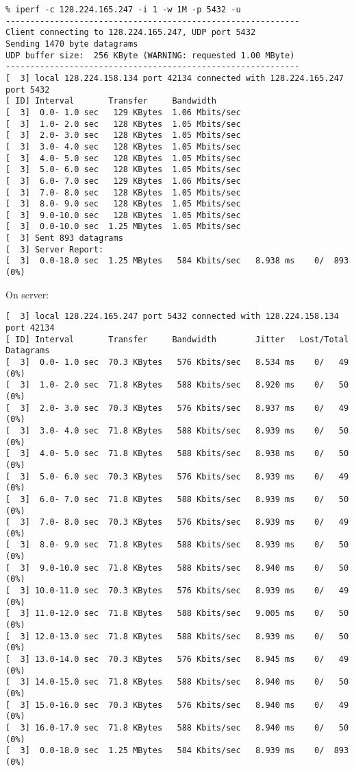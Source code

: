 \documentclass[a4paper]{report}
\begin{document}
\begin{lstlisting}
% iperf -c 128.224.165.247 -i 1 -w 1M -p 5432 -u
------------------------------------------------------------
Client connecting to 128.224.165.247, UDP port 5432
Sending 1470 byte datagrams
UDP buffer size:  256 KByte (WARNING: requested 1.00 MByte)
------------------------------------------------------------
[  3] local 128.224.158.134 port 42134 connected with 128.224.165.247 port 5432
[ ID] Interval       Transfer     Bandwidth
[  3]  0.0- 1.0 sec   129 KBytes  1.06 Mbits/sec
[  3]  1.0- 2.0 sec   128 KBytes  1.05 Mbits/sec
[  3]  2.0- 3.0 sec   128 KBytes  1.05 Mbits/sec
[  3]  3.0- 4.0 sec   128 KBytes  1.05 Mbits/sec
[  3]  4.0- 5.0 sec   128 KBytes  1.05 Mbits/sec
[  3]  5.0- 6.0 sec   128 KBytes  1.05 Mbits/sec
[  3]  6.0- 7.0 sec   129 KBytes  1.06 Mbits/sec
[  3]  7.0- 8.0 sec   128 KBytes  1.05 Mbits/sec
[  3]  8.0- 9.0 sec   128 KBytes  1.05 Mbits/sec
[  3]  9.0-10.0 sec   128 KBytes  1.05 Mbits/sec
[  3]  0.0-10.0 sec  1.25 MBytes  1.05 Mbits/sec
[  3] Sent 893 datagrams
[  3] Server Report:
[  3]  0.0-18.0 sec  1.25 MBytes   584 Kbits/sec   8.938 ms    0/  893 (0%)
\end{lstlisting}
On server:
\begin{lstlisting}
[  3] local 128.224.165.247 port 5432 connected with 128.224.158.134 port 42134
[ ID] Interval       Transfer     Bandwidth        Jitter   Lost/Total Datagrams
[  3]  0.0- 1.0 sec  70.3 KBytes   576 Kbits/sec   8.534 ms    0/   49 (0%)
[  3]  1.0- 2.0 sec  71.8 KBytes   588 Kbits/sec   8.920 ms    0/   50 (0%)
[  3]  2.0- 3.0 sec  70.3 KBytes   576 Kbits/sec   8.937 ms    0/   49 (0%)
[  3]  3.0- 4.0 sec  71.8 KBytes   588 Kbits/sec   8.939 ms    0/   50 (0%)
[  3]  4.0- 5.0 sec  71.8 KBytes   588 Kbits/sec   8.938 ms    0/   50 (0%)
[  3]  5.0- 6.0 sec  70.3 KBytes   576 Kbits/sec   8.939 ms    0/   49 (0%)
[  3]  6.0- 7.0 sec  71.8 KBytes   588 Kbits/sec   8.939 ms    0/   50 (0%)
[  3]  7.0- 8.0 sec  70.3 KBytes   576 Kbits/sec   8.939 ms    0/   49 (0%)
[  3]  8.0- 9.0 sec  71.8 KBytes   588 Kbits/sec   8.939 ms    0/   50 (0%)
[  3]  9.0-10.0 sec  71.8 KBytes   588 Kbits/sec   8.940 ms    0/   50 (0%)
[  3] 10.0-11.0 sec  70.3 KBytes   576 Kbits/sec   8.939 ms    0/   49 (0%)
[  3] 11.0-12.0 sec  71.8 KBytes   588 Kbits/sec   9.005 ms    0/   50 (0%)
[  3] 12.0-13.0 sec  71.8 KBytes   588 Kbits/sec   8.939 ms    0/   50 (0%)
[  3] 13.0-14.0 sec  70.3 KBytes   576 Kbits/sec   8.945 ms    0/   49 (0%)
[  3] 14.0-15.0 sec  71.8 KBytes   588 Kbits/sec   8.940 ms    0/   50 (0%)
[  3] 15.0-16.0 sec  70.3 KBytes   576 Kbits/sec   8.940 ms    0/   49 (0%)
[  3] 16.0-17.0 sec  71.8 KBytes   588 Kbits/sec   8.940 ms    0/   50 (0%)
[  3]  0.0-18.0 sec  1.25 MBytes   584 Kbits/sec   8.939 ms    0/  893 (0%)
\end{lstlisting}
\end{document}
